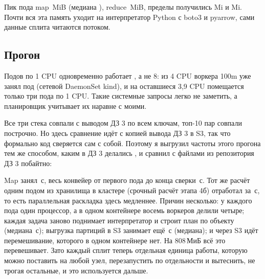 
Пик пода map \mapPeakMax\,MiB (медиана \mapPeakMed), reduce \reducePeakMax\,MiB, пределы получились \mapLimit Mi и \reduceLimit Mi. Почти вся эта память уходит на интерпретатор Python с boto3 и pyarrow, сами данные сплита читаются потоком.

\subsection{Прогон}

Подов по 1 CPU одновременно работает \parMaxRun, а не 8: из 4 CPU воркера 100m уже занял под  (сетевой DaemonSet kind), и на оставшиеся 3,9 CPU помещается только три пода по 1 CPU. Такие системные запросы легко не заметить, а планировщик учитывает их наравне с моими.




Все три стека совпали с выводом ДЗ 3 по всем ключам, топ-10 пар совпали построчно. Но здесь сравнение идёт с копией вывода ДЗ 3 в S3, так что формально код сверяется сам с собой. Поэтому я выгрузил частоты этого прогона тем же способом, каким в ДЗ 3 делались , и сравнил с файлами из репозитория ДЗ 3 побайтно:


Map занял \parMapSpan\,с, весь конвейер от первого пода до конца сверки \parTotal\,с. Тот же расчёт одним подом из хранилища в кластере (срочный расчёт этапа 4б) отработал за \urgentWall\,с, то есть параллельная раскладка здесь медленнее. Причин несколько: у каждого пода один процессор, а в одном контейнере восемь воркеров делили четыре; каждая задача заново поднимает интерпретатор и строит план по объекту (медиана \mapPlanMed\,с); выгрузка партиций в S3 занимает ещё \mapUploadMed\,с (медиана); и через S3 идёт перемешивание, которого в одном контейнере нет. На 808\,МиБ всё это перевешивает. Зато каждый сплит теперь отдельная единица работы, которую можно поставить на любой узел, перезапустить по отдельности и вытеснить, не трогая остальные, и это используется дальше.

